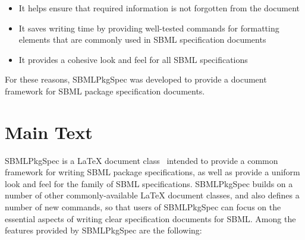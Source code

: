\documentclass{bmcart}
\newcommand{\sbmlpkg}{SBMLPkgSpec}
\begin{document}
\begin{itemize}

\item It helps ensure that required information is not forgotten from the document

\item It saves writing time by providing well-tested commands for formatting elements that are commonly used in SBML specification documents

\item It provides a cohesive look and feel for all SBML specifications

\end{itemize}

For these reasons, \sbmlpkg{} was developed to provide a document framework for SBML package specification documents.


\section*{Main Text}

\sbmlpkg{} is a LaTeX document class~\cite{lamport1994} intended to provide a common framework for writing SBML package specifications, as well as provide a uniform look and feel for the family of SBML specifications.  \sbmlpkg{} builds on a number of other commonly-available LaTeX document classes, and also defines a number of new commands, so that users of \sbmlpkg{} can focus on the essential aspects of writing clear specification documents for SBML.  Among the features provided by \sbmlpkg{} are the following:
\end{document}
